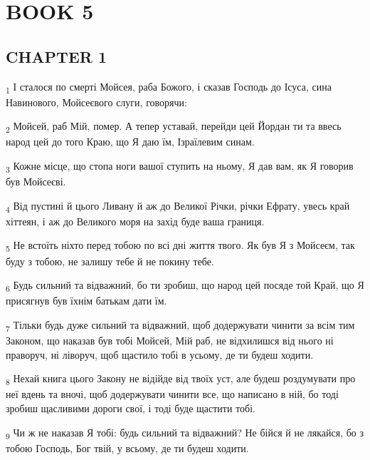 \section{BOOK 5}
\subsection{CHAPTER 1}
\begin{tcolorbox}
\textsubscript{1} І сталося по смерті Мойсея, раба Божого, і сказав Господь до Ісуса, сина Навинового, Мойсеєвого слуги, говорячи:
\end{tcolorbox}
\begin{tcolorbox}
\textsubscript{2} Мойсей, раб Мій, помер. А тепер уставай, перейди цей Йордан ти та ввесь народ цей до того Краю, що Я даю їм, Ізраїлевим синам.
\end{tcolorbox}
\begin{tcolorbox}
\textsubscript{3} Кожне місце, що стопа ноги вашої ступить на ньому, Я дав вам, як Я говорив був Мойсеєві.
\end{tcolorbox}
\begin{tcolorbox}
\textsubscript{4} Від пустині й цього Ливану й аж до Великої Річки, річки Ефрату, увесь край хіттеян, і аж до Великого моря на захід буде ваша границя.
\end{tcolorbox}
\begin{tcolorbox}
\textsubscript{5} Не встоїть ніхто перед тобою по всі дні життя твого. Як був Я з Мойсеєм, так буду з тобою, не залишу тебе й не покину тебе.
\end{tcolorbox}
\begin{tcolorbox}
\textsubscript{6} Будь сильний та відважний, бо ти зробиш, що народ цей посяде той Край, що Я присягнув був їхнім батькам дати їм.
\end{tcolorbox}
\begin{tcolorbox}
\textsubscript{7} Тільки будь дуже сильний та відважний, щоб додержувати чинити за всім тим Законом, що наказав був тобі Мойсей, Мій раб, не відхилишся від нього ні праворуч, ні ліворуч, щоб щастило тобі в усьому, де ти будеш ходити.
\end{tcolorbox}
\begin{tcolorbox}
\textsubscript{8} Нехай книга цього Закону не відійде від твоїх уст, але будеш роздумувати про неї вдень та вночі, щоб додержувати чинити все, що написано в ній, бо тоді зробиш щасливими дороги свої, і тоді буде щастити тобі.
\end{tcolorbox}
\begin{tcolorbox}
\textsubscript{9} Чи ж не наказав Я тобі: будь сильний та відважний? Не бійся й не лякайся, бо з тобою Господь, Бог твій, у всьому, де ти будеш ходити.
\end{tcolorbox}
